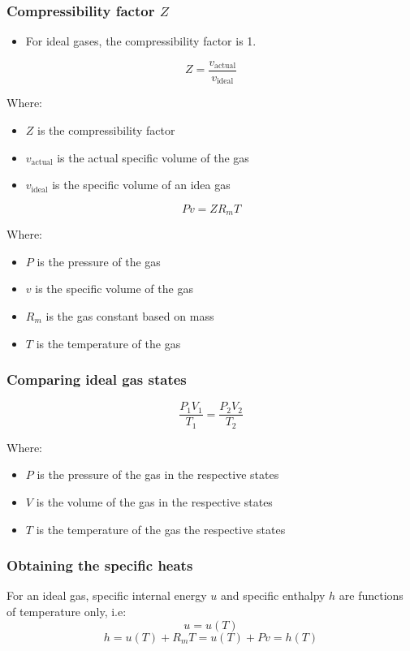 \documentclass[11pt]{article}
\begin{document}
\subsubsection{Compressibility factor \(Z\)}
\label{sec:org75df0b1}
\begin{itemize}
\item For ideal gases, the compressibility factor is 1.
\end{itemize}

\[Z = \frac{v_{\text{actual}}}{v_{\text{ideal}}}\]

Where:
\begin{itemize}
\item \(Z\) is the compressibility factor
\item \(v_{\text{actual}}\) is the actual specific volume of the gas
\item \(v_{\text{ideal}}\) is the specific volume of an idea gas
\end{itemize}

\[Pv = ZR_mT\]

Where:
\begin{itemize}
\item \(P\) is the pressure of the gas
\item \(v\) is the specific volume of the gas
\item \(R_m\) is the gas constant based on mass
\item \(T\) is the temperature of the gas
\end{itemize}
\subsubsection{Comparing ideal gas states}
\label{sec:org076335e}
\[\frac{P_1 V_1}{T_1} = \frac{P_2 V_2}{T_2}\]

Where:
\begin{itemize}
\item \(P\) is the pressure of the gas in the respective states
\item \(V\) is the volume of the gas in the respective states
\item \(T\) is the temperature of the gas the respective states
\end{itemize}
\subsubsection{Obtaining the specific heats}
\label{sec:orga7765bc}
For an ideal gas, specific internal energy \(u\) and specific enthalpy \(h\) are functions of temperature only, i.e:
\[u = u(T)\]
\[h = u(T) + R_mT = u(T) + Pv = h(T)\]
\end{document}
